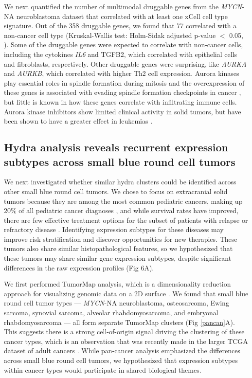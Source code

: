 \documentclass[10pt,letterpaper]{article}
\begin{document}
We next quantified the number of multimodal druggable genes from the \textit{MYCN}-NA neuroblastoma dataset that correlated with at least one xCell cell type signature. Out of the 358 druggable genes, we found that 77 correlated with a non-cancer cell type (Kruskal-Wallis test: Holm-Sidak adjusted p-value $<$ 0.05, ). Some of the druggable genes were expected to correlate with non-cancer cells, including the cytokines \textit{IL6} and TGFB2, which correlated with epithelial cells and fibroblasts, respectively. Other druggable genes were surprising, like \textit{AURKA} and \textit{AURKB}, which correlated with higher Th2 cell expression. Aurora kinases play essential roles in spindle formation during mitosis and the overexpression of these genes is associated with evading spindle formation checkpoints in cancer \cite{marisInitialTestingAurora2010}, but little is known in how these genes correlate with infiltrating immune cells. Aurora kinase inhibitors show limited clinical activity in solid tumors, but have been shown to have a greater effect in leukemias \cite{marisInitialTestingAurora2010,gautschiAuroraKinasesAnticancer2008}.

\subsection*{Hydra analysis reveals recurrent expression subtypes across small blue round cell tumors}
We next investigated whether similar hydra clusters could be identified across other small blue round cell tumors. We chose to focus on extracranial solid tumors because they are among the most common pediatric cancers, making up 20\% of all pediatric cancer diagnoses \cite{riesCancerIncidenceSurvival1999}, and while survival rates have improved, there are few effective treatment options for the subset of patients with relapse or refractory disease \cite{ringCheckpointProteinsPediatric2017}. Identifying expression subtypes for these diseases may improve risk stratification and discover opportunities for new therapies. These tumors also share similar histopathological features, so we hypothesized that these tumors may share similar gene expression subtypes, despite significant differences in the raw expression profiles (Fig 6A).  

We first performed TumorMap analysis, which is a dimensionality reduction approach for visualizing genomic data on a 2D surface \cite{newtonTumorMapExploringMolecular2017}. We found that small blue round cell tumor types --- \textit{MYCN}-NA neuroblastoma, osteosarcoma, Ewing sarcoma, synovial sarcoma, alveolar rhabdomyosarcoma, and embryonal rhabdomyosarcoma --- all form separate TumorMap clusters (Fig \ref{pancan}A). This suggests there is a strong cell-of-origin signal driving the clustering of these cancer types, which is an observation that was recently made in the larger TCGA dataset of adult cancers \cite{hoadleyCellofOriginPatternsDominate2018}. While pan-cancer analysis emphasized the differences across small blue round cell tumors, we hypothesized that expression subtypes within cancer types would participate in shared biological themes.
\end{document}
